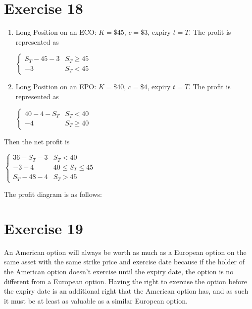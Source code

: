 \documentclass{article}
\begin{document}
\section*{Exercise 18}
\begin{enumerate}
    \item Long Position on an ECO:
    $K = \$45$, $c = \$3$, expiry $t=T$. The profit is represented as
    \begin{center}
        $\begin{cases}
            S_T - 45 - 3 & S_T \geq 45 \\
            -3 & S_T < 45
        \end{cases}$
    \end{center}
    
    \item Long Position on an EPO:
    $K = \$40$, $c = \$4$, expiry $t=T$. The profit is represented as
    \begin{center}
        $\begin{cases}
            40-4-S_T & S_T < 40 \\
            -4 & S_T \geq 40
        \end{cases}$
    \end{center}
\end{enumerate}
Then the net profit is 
\begin{center}
    $\begin{cases}
        36-S_T-3 & S_T < 40 \\
        -3-4 & 40 \leq S_T \leq 45 \\
        S_T - 48 - 4 & S_T > 45
    \end{cases}$
\end{center}
The profit diagram is as follows:
\begin{center}
\end{center}

\section*{Exercise 19}
An American option will always be worth as much as a European option on the same asset with the same strike price
and exercise date because if the holder of the American option doesn't exercise until the
expiry date, the option is no different from a European option. Having the right to 
exercise the option before the expiry date is an additional right that the American 
option has, and as such it must be at least as valuable as a similar European option.
\end{document}
